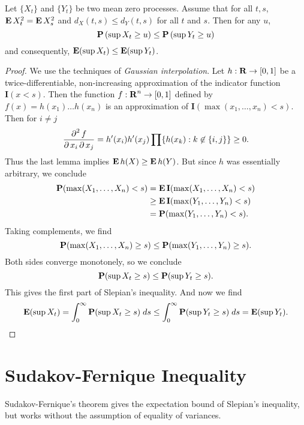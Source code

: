 \begin{theorem}
    Let $\{ X_t \}$ and $\{ Y_t \}$ be two mean zero processes. Assume that for all $t,s$, $\operatorname{\mathbf{E}} X_t^2 = \operatorname{\mathbf{E}} X_s^2$ and $d_X(t,s) \leq d_Y(t,s)$ for all $t$ and $s$. Then for any $u$,
    \[ \operatorname{\mathbf{P}} \left( \sup X_t \geq u \right) \leq \operatorname{\mathbf{P}} \left( \sup Y_t \geq u \right) \]
    and consequently, $\operatorname{\mathbf{E}}(\sup X_t) \leq \operatorname{\mathbf{E}}(\sup Y_t)$.
\end{theorem}
\begin{proof}
    We use the techniques of \emph{Gaussian interpolation}. Let $h: \operatorname{\mathbf{R}} \to [0,1]$ be a twice-differentiable, non-increasing approximation of the indicator function $\mathbf{I}(x < s)$. Then the function $f: \operatorname{\mathbf{R}}^n \to [0,1]$ defined by $f(x) = h(x_1) \dots h(x_n)$ is an approximation of $\mathbf{I}(\max(x_1, \dots, x_n) < s)$. Then for $i \neq j$
    \[ \frac{\operatorname{\partial}^2 f}{\operatorname{\partial} x_i \operatorname{\partial} x_j} = h'(x_i) h'(x_j) \prod \{ h(x_k) : k \not \in \{ i, j \} \} \geq 0. \]
    Thus the last lemma implies $\operatorname{\mathbf{E}} h(X) \geq \operatorname{\mathbf{E}} h(Y)$. But since $h$ was essentially arbitrary, we conclude
    \begin{align*}
        \operatorname{\mathbf{P}}(\max(X_1, \dots, X_n) < s) &= \operatorname{\mathbf{E}} \mathbf{I}(\max(X_1, \dots, X_n) < s)\\
        &\geq \operatorname{\mathbf{E}} \mathbf{I}(\max(Y_1, \dots, Y_n) < s)\\
        &= \operatorname{\mathbf{P}}(\max(Y_1, \dots, Y_n) < s).
    \end{align*}
    Taking complements, we find
    \[ \operatorname{\mathbf{P}}(\max(X_1, \dots, X_n) \geq s) \leq \operatorname{\mathbf{P}}(\max(Y_1, \dots, Y_n) \geq s). \]
    Both sides converge monotonely, so we conclude
    \[ \operatorname{\mathbf{P}}(\sup X_t \geq s) \leq \operatorname{\mathbf{P}}(\sup Y_t \geq s). \]
    This gives the first part of Slepian's inequality. And now we find
    \[ \operatorname{\mathbf{E}}(\sup X_t) = \int_0^\infty \operatorname{\mathbf{P}}(\sup X_t \geq s)\; ds \leq \int_0^\infty \operatorname{\mathbf{P}}(\sup Y_t \geq s)\; ds = \operatorname{\mathbf{E}}(\sup Y_t). \qedhere \]
\end{proof}








\section{Sudakov-Fernique Inequality}

Sudakov-Fernique's theorem gives the expectation bound of Slepian's inequality, but works without the assumption of equality of variances.

